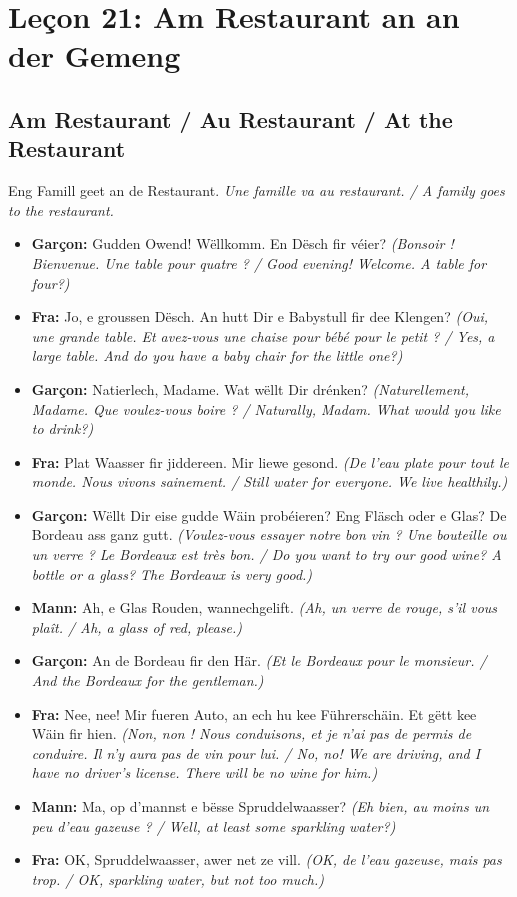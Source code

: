 \chapter{Leçon 21: Am Restaurant an an der Gemeng}

\section{Am Restaurant / Au Restaurant / At the Restaurant}

Eng Famill geet an de Restaurant. \textit{Une famille va au restaurant. / A family goes to the restaurant.}

\begin{itemize}
    \item \textbf{Garçon:} Gudden Owend! Wëllkomm. En Dësch fir véier? \textit{(Bonsoir ! Bienvenue. Une table pour quatre ? / Good evening! Welcome. A table for four?)}
    \item \textbf{Fra:} Jo, e groussen Dësch. An hutt Dir e Babystull fir dee Klengen? \textit{(Oui, une grande table. Et avez-vous une chaise pour bébé pour le petit ? / Yes, a large table. And do you have a baby chair for the little one?)}
    \item \textbf{Garçon:} Natierlech, Madame. Wat wëllt Dir drénken? \textit{(Naturellement, Madame. Que voulez-vous boire ? / Naturally, Madam. What would you like to drink?)}
    \item \textbf{Fra:} Plat Waasser fir jiddereen. Mir liewe gesond. \textit{(De l'eau plate pour tout le monde. Nous vivons sainement. / Still water for everyone. We live healthily.)}
    \item \textbf{Garçon:} Wëllt Dir eise gudde Wäin probéieren? Eng Fläsch oder e Glas? De Bordeau ass ganz gutt. \textit{(Voulez-vous essayer notre bon vin ? Une bouteille ou un verre ? Le Bordeaux est très bon. / Do you want to try our good wine? A bottle or a glass? The Bordeaux is very good.)}
    \item \textbf{Mann:} Ah, e Glas Rouden, wannechgelift. \textit{(Ah, un verre de rouge, s'il vous plaît. / Ah, a glass of red, please.)}
    \item \textbf{Garçon:} An de Bordeau fir den Här. \textit{(Et le Bordeaux pour le monsieur. / And the Bordeaux for the gentleman.)}
    \item \textbf{Fra:} Nee, nee! Mir fueren Auto, an ech hu kee Führerschäin. Et gëtt kee Wäin fir hien. \textit{(Non, non ! Nous conduisons, et je n'ai pas de permis de conduire. Il n'y aura pas de vin pour lui. / No, no! We are driving, and I have no driver's license. There will be no wine for him.)}
    \item \textbf{Mann:} Ma, op d'mannst e bësse Spruddelwaasser? \textit{(Eh bien, au moins un peu d'eau gazeuse ? / Well, at least some sparkling water?)}
    \item \textbf{Fra:} OK, Spruddelwaasser, awer net ze vill. \textit{(OK, de l'eau gazeuse, mais pas trop. / OK, sparkling water, but not too much.)}
\end{itemize}


